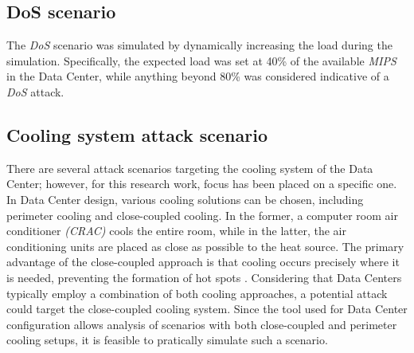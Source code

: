 \subsection{DoS scenario}
The \emph{DoS} scenario was simulated by dynamically increasing the load during the simulation. Specifically, the expected load was set at 40\% of the available \emph{MIPS} in the Data Center, while anything beyond 80\% was considered indicative of a \emph{DoS} attack.

\subsection{Cooling system attack scenario} \label{subsection:coolingsystemattack}
There are several attack scenarios targeting the cooling system of the Data Center; however, for this research work, focus has been placed on a specific one. In Data Center design, various cooling solutions can be chosen, including perimeter cooling and close-coupled cooling. In the former, a computer room air conditioner \emph{(CRAC)} cools the entire room, while in the latter, the air conditioning units are placed as close as possible to the heat source. The primary advantage of the close-coupled approach is that cooling occurs precisely where it is needed, preventing the formation of hot spots \cite{anixter}.
Considering that Data Centers typically employ a combination of both cooling approaches, a potential attack could target the close-coupled cooling system. Since the tool used for Data Center configuration allows analysis of scenarios with both close-coupled and perimeter cooling setups, it is feasible to pratically simulate such a scenario. 

